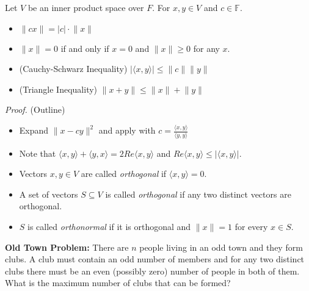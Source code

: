 \documentclass[12pt]{article}
\newenvironment{theorem}[2][Theorem]{\begin{trivlist}
\item[\hskip \labelsep {\bfseries #1}\hskip \labelsep {\bfseries #2.}]}{\end{trivlist}}
\newenvironment{definition}[2][Definition]{\begin{trivlist}
\item[\hskip \labelsep {\bfseries #1}\hskip \labelsep {\bfseries #2}]}{\end{trivlist}}
\begin{document}
\begin{theorem}{6.2}
Let $V$ be an inner product space over $F$. For $x,y \in V$ and $c \in \mathbb{F}$.

\begin{itemize}
    \item[(a)] $\lVert cx \rVert = |c| \cdot \lVert x \rVert$
    
    \item[(b)] $\lVert x \rVert = 0$ if and only if $x = 0$ and $\lVert x \rVert \geq 0$ for any $x$.
    
    \item[(c)] (Cauchy-Schwarz Inequality) $\lvert \langle x, y \rangle \rvert \leq \lVert c \rVert \lVert y \rVert$
    
    \item[(d)] (Triangle Inequality) $\lVert x + y \rVert \leq \lVert x \rVert + \lVert y \rVert$
\end{itemize}
\end{theorem}

\textit{Proof.} (Outline)

\begin{itemize}
    \item[(c)] Expand $\lVert x - cy\rVert^2$ and apply with $c = \frac{\langle x, y \rangle}{\langle y, y \rangle}$
    
    \item[(d)] Note that $\langle x, y \rangle + \langle y, x \rangle = 2Re\langle x, y \rangle$ and $Re\langle x, y \rangle \leq \lvert \langle x, y \rangle \rvert$.
\end{itemize}

\begin{definition}{4} \textit{ }
\begin{itemize}
    \item Vectors $x,y \in V$ are called \textit{orthogonal} if $\langle x, y \rangle = 0$.
    
    \item A set of vectors $S \subseteq V$ is called \textit{orthogonal} if any two distinct vectors are orthogonal.
    
    \item $S$ is called \textit{orthonormal} if it is orthogonal and $\lVert x \rVert = 1$ for every $x \in S$.
\end{itemize}
\end{definition}

\textbf{Old Town Problem:} There are $n$ people living in an odd town and they form clubs. A club must contain an odd number of members and for any two distinct clubs there must be an even (possibly zero) number of people in both of them. What is the maximum number of clubs that can be formed?
\end{document}
